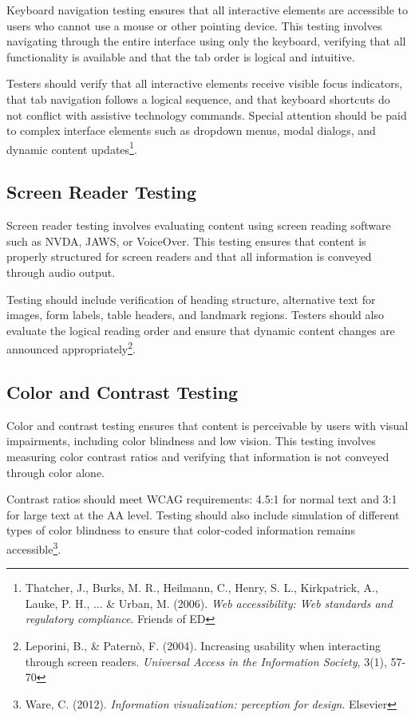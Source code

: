 Keyboard navigation testing ensures that all interactive elements are accessible to users who cannot use a mouse or other pointing device. This testing involves navigating through the entire interface using only the keyboard, verifying that all functionality is available and that the tab order is logical and intuitive.

Testers should verify that all interactive elements receive visible focus indicators, that tab navigation follows a logical sequence, and that keyboard shortcuts do not conflict with assistive technology commands. Special attention should be paid to complex interface elements such as dropdown menus, modal dialogs, and dynamic content updates\footnote{Thatcher, J., Burks, M. R., Heilmann, C., Henry, S. L., Kirkpatrick, A., Lauke, P. H., ... \& Urban, M. (2006). \textit{Web accessibility: Web standards and regulatory compliance}. Friends of ED}.

\subsection{Screen Reader Testing}

Screen reader testing involves evaluating content using screen reading software such as NVDA, JAWS, or VoiceOver. This testing ensures that content is properly structured for screen readers and that all information is conveyed through audio output.

Testing should include verification of heading structure, alternative text for images, form labels, table headers, and landmark regions. Testers should also evaluate the logical reading order and ensure that dynamic content changes are announced appropriately\footnote{Leporini, B., \& Paternò, F. (2004). Increasing usability when interacting through screen readers. \textit{Universal Access in the Information Society}, 3(1), 57-70}.

\subsection{Color and Contrast Testing}

Color and contrast testing ensures that content is perceivable by users with visual impairments, including color blindness and low vision. This testing involves measuring color contrast ratios and verifying that information is not conveyed through color alone.

Contrast ratios should meet WCAG requirements: 4.5:1 for normal text and 3:1 for large text at the AA level. Testing should also include simulation of different types of color blindness to ensure that color-coded information remains accessible\footnote{Ware, C. (2012). \textit{Information visualization: perception for design}. Elsevier}.

